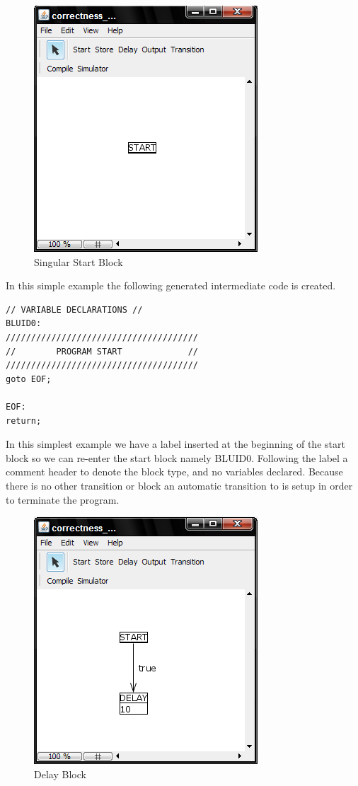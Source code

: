 \begin{figure}[htb]
	\centering
	\includegraphics[width=\imgmedphoto]{./images/correctness_ex_start.png}
	\caption{Singular Start Block}
	\label{fig:correctness_ex_start}
\end{figure}
In this simple example the following generated intermediate code  is created.

\begin{minipage}{\textwidth}
\begin{lstlisting}[frame=single]
// VARIABLE DECLARATIONS //
BLUID0:
//////////////////////////////////////
//        PROGRAM START             //
//////////////////////////////////////
goto EOF;

EOF:
return;
\end{lstlisting}
\end{minipage}

In this simplest example we have a label inserted at the beginning of the start block so we can re-enter the start block namely BLUID0. Following the label a comment header to denote the block type, and no variables declared.  Because there is no other transition or block an automatic transition to  is setup in order to terminate the program.

\begin{figure}[htb]
	\centering
	\includegraphics[width=\imgmedphoto]{./images/correctness_ex_delay.png}
	\caption{Delay Block}
	\label{fig:correctness_ex_delay}
\end{figure}

